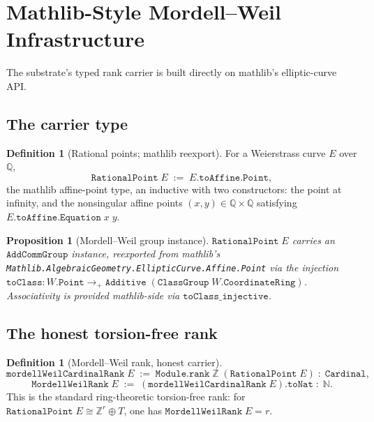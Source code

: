 \documentclass[11pt,a4paper]{article}
\theoremstyle{plain}
\newtheorem{proposition}[theorem]{Proposition}
\theoremstyle{definition}
\newtheorem{definition}[theorem]{Definition}
\theoremstyle{remark}
\newcommand{\Q}{\mathbb{Q}}
\newcommand{\Z}{\mathbb{Z}}
\newcommand{\N}{\mathbb{N}}
\begin{document}
\section{Mathlib-Style Mordell--Weil Infrastructure}
\label{sec:MWgroup}

The substrate's typed rank carrier is built directly on
mathlib's elliptic-curve API.

\subsection{The carrier type}

\begin{definition}[Rational points; mathlib reexport]
\label{def:RationalPoint}
For a Weierstrass curve $E$ over $\Q$,
\[
\mathtt{RationalPoint}\;E
\;:=\; E.\mathtt{toAffine}.\mathtt{Point},
\]
the mathlib affine-point type, an inductive with two
constructors: the point at infinity, and the nonsingular affine
points $(x, y) \in \Q \times \Q$ satisfying
$E.\mathtt{toAffine}.\mathtt{Equation}\;x\;y$.
\end{definition}

\begin{proposition}[Mordell--Weil group instance]
\label{prop:AddCommGroup}
$\mathtt{RationalPoint}\;E$ carries an $\mathtt{AddCommGroup}$
instance, reexported from mathlib's
\texttt{Mathlib.AlgebraicGeometry.EllipticCurve.Affine.Point} via
the injection
$\mathtt{toClass}\colon W.\mathtt{Point} \to_{+} \mathtt{Additive}\;
(\mathtt{ClassGroup}\;W.\mathtt{CoordinateRing})$.
Associativity is provided mathlib-side via
$\mathtt{toClass\_injective}$.
\end{proposition}

\subsection{The honest torsion-free rank}

\begin{definition}[Mordell--Weil rank, honest carrier]
\label{def:MWrank}
\
\[
\mathtt{mordellWeilCardinalRank}\;E
\;:=\; \mathtt{Module.rank}\;\Z\;(\mathtt{RationalPoint}\;E)
\;:\; \mathtt{Cardinal},
\]
\[
\mathtt{MordellWeilRank}\;E
\;:=\; (\mathtt{mordellWeilCardinalRank}\;E).\mathtt{toNat}
\;:\; \N.
\]
This is the standard ring-theoretic torsion-free rank: for
$\mathtt{RationalPoint}\;E \cong \Z^{r} \oplus T$, one has
$\mathtt{MordellWeilRank}\;E = r$.
\end{definition}
\end{document}
